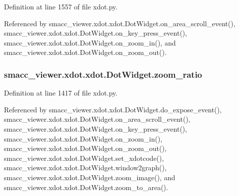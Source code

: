 Definition at line 1557 of file xdot.\+py.



Referenced by smacc\+\_\+viewer.\+xdot.\+xdot.\+Dot\+Widget.\+on\+\_\+area\+\_\+scroll\+\_\+event(), smacc\+\_\+viewer.\+xdot.\+xdot.\+Dot\+Widget.\+on\+\_\+key\+\_\+press\+\_\+event(), smacc\+\_\+viewer.\+xdot.\+xdot.\+Dot\+Widget.\+on\+\_\+zoom\+\_\+in(), and smacc\+\_\+viewer.\+xdot.\+xdot.\+Dot\+Widget.\+on\+\_\+zoom\+\_\+out().

\subsubsection[{\texorpdfstring{zoom\+\_\+ratio}{zoom_ratio}}]{\setlength{\rightskip}{0pt plus 5cm}smacc\+\_\+viewer.\+xdot.\+xdot.\+Dot\+Widget.\+zoom\+\_\+ratio}\hypertarget{classsmacc__viewer_1_1xdot_1_1xdot_1_1DotWidget_a61694eba4278e9726bbef68a9ca3f594}{}\label{classsmacc__viewer_1_1xdot_1_1xdot_1_1DotWidget_a61694eba4278e9726bbef68a9ca3f594}


Definition at line 1417 of file xdot.\+py.



Referenced by smacc\+\_\+viewer.\+xdot.\+xdot.\+Dot\+Widget.\+do\+\_\+expose\+\_\+event(), smacc\+\_\+viewer.\+xdot.\+xdot.\+Dot\+Widget.\+on\+\_\+area\+\_\+scroll\+\_\+event(), smacc\+\_\+viewer.\+xdot.\+xdot.\+Dot\+Widget.\+on\+\_\+key\+\_\+press\+\_\+event(), smacc\+\_\+viewer.\+xdot.\+xdot.\+Dot\+Widget.\+on\+\_\+zoom\+\_\+in(), smacc\+\_\+viewer.\+xdot.\+xdot.\+Dot\+Widget.\+on\+\_\+zoom\+\_\+out(), smacc\+\_\+viewer.\+xdot.\+xdot.\+Dot\+Widget.\+set\+\_\+xdotcode(), smacc\+\_\+viewer.\+xdot.\+xdot.\+Dot\+Widget.\+window2graph(), smacc\+\_\+viewer.\+xdot.\+xdot.\+Dot\+Widget.\+zoom\+\_\+image(), and smacc\+\_\+viewer.\+xdot.\+xdot.\+Dot\+Widget.\+zoom\+\_\+to\+\_\+area().

